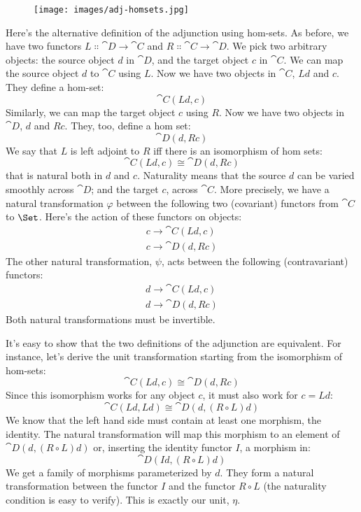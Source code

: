 \begin{figure}[H]
  \centering
  \texttt{[image: images/adj-homsets.jpg]}
\end{figure}

\noindent
Here's the alternative definition of the adjunction using hom-sets. As
before, we have two functors $L \Colon \cat{D} \to \cat{C}$ and
$R \Colon \cat{C} \to \cat{D}$. We pick two arbitrary objects: the
source object $d$ in $\cat{D}$, and the target object $c$
in $\cat{C}$. We can map the source object $d$ to $\cat{C}$ using
$L$. Now we have two objects in $\cat{C}$, $L d$ and
$c$. They define a hom-set:
\[\cat{C}(L d, c)\]
Similarly, we can map the target object $c$ using $R$. Now
we have two objects in $\cat{D}$, $d$ and $R c$. They,
too, define a hom set:
\[\cat{D}(d, R c)\]
We say that $L$ is left adjoint to $R$ iff there is an
isomorphism of hom sets:
\[\cat{C}(L d, c) \cong \cat{D}(d, R c)\]
that is natural both in $d$ and $c$.
Naturality means that the source $d$ can be varied smoothly
across $\cat{D}$; and the target $c$, across $\cat{C}$. More
precisely, we have a natural transformation $\varphi$ between the
following two (covariant) functors from $\cat{C}$ to $\Set$. Here's
the action of these functors on objects:
\begin{gather*}
  c \to \cat{C}(L d, c) \\
  c \to \cat{D}(d, R c)
\end{gather*}
The other natural transformation, $\psi$, acts between the following
(contravariant) functors:
\begin{gather*}
  d \to \cat{C}(L d, c) \\
  d \to \cat{D}(d, R c)
\end{gather*}
Both natural transformations must be invertible.

It's easy to show that the two definitions of the adjunction are
equivalent. For instance, let's derive the unit transformation starting
from the isomorphism of hom-sets:
\[\cat{C}(L d, c) \cong \cat{D}(d, R c)\]
Since this isomorphism works for any object $c$, it must also
work for $c = L d$:
\[\cat{C}(L d, L d) \cong \cat{D}(d, (R \circ L) d)\]
We know that the left hand side must contain at least one morphism, the
identity. The natural transformation will map this morphism to an
element of $\cat{D}(d, (R \circ L) d)$ or, inserting the identity
functor $I$, a morphism in:
\[\cat{D}(I d, (R \circ L) d)\]
We get a family of morphisms parameterized by $d$. They form a
natural transformation between the functor $I$ and the functor
$R \circ L$ (the naturality condition is easy to verify). This is
exactly our unit, $\eta$.

